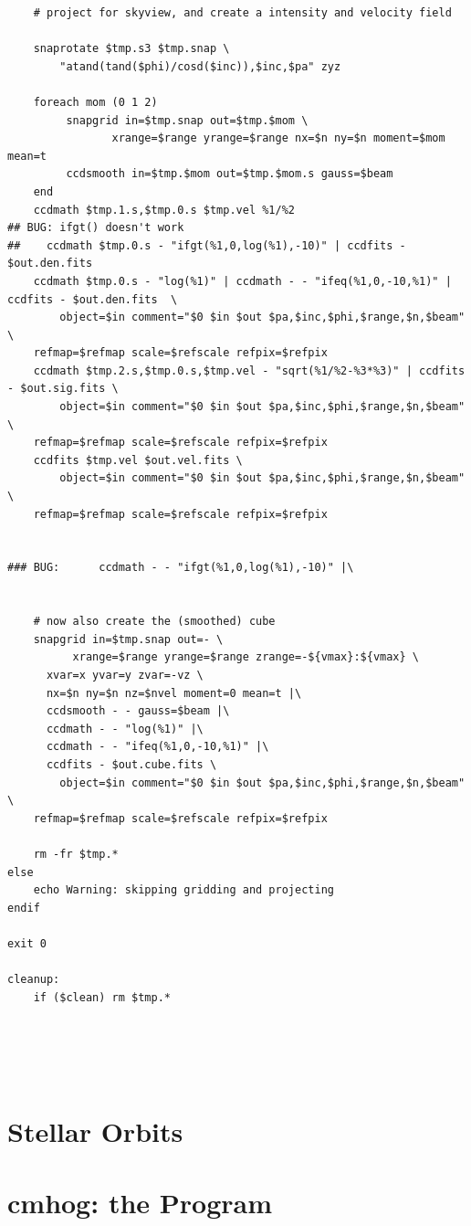 \documentclass[10pt,dvips]{article}
\begin{document}
\begin{verbatim}
    # project for skyview, and create a intensity and velocity field

    snaprotate $tmp.s3 $tmp.snap \
        "atand(tand($phi)/cosd($inc)),$inc,$pa" zyz

    foreach mom (0 1 2)
         snapgrid in=$tmp.snap out=$tmp.$mom \
                xrange=$range yrange=$range nx=$n ny=$n moment=$mom mean=t
         ccdsmooth in=$tmp.$mom out=$tmp.$mom.s gauss=$beam
    end
    ccdmath $tmp.1.s,$tmp.0.s $tmp.vel %1/%2
## BUG: ifgt() doesn't work
##    ccdmath $tmp.0.s - "ifgt(%1,0,log(%1),-10)" | ccdfits - $out.den.fits
    ccdmath $tmp.0.s - "log(%1)" | ccdmath - - "ifeq(%1,0,-10,%1)" | ccdfits - $out.den.fits  \
        object=$in comment="$0 $in $out $pa,$inc,$phi,$range,$n,$beam"  \
	refmap=$refmap scale=$refscale refpix=$refpix
    ccdmath $tmp.2.s,$tmp.0.s,$tmp.vel - "sqrt(%1/%2-%3*%3)" | ccdfits - $out.sig.fits \
        object=$in comment="$0 $in $out $pa,$inc,$phi,$range,$n,$beam" 	\
	refmap=$refmap scale=$refscale refpix=$refpix
    ccdfits $tmp.vel $out.vel.fits \
        object=$in comment="$0 $in $out $pa,$inc,$phi,$range,$n,$beam" 	\
	refmap=$refmap scale=$refscale refpix=$refpix


### BUG:      ccdmath - - "ifgt(%1,0,log(%1),-10)" |\


    # now also create the (smoothed) cube
    snapgrid in=$tmp.snap out=- \
          xrange=$range yrange=$range zrange=-${vmax}:${vmax} \
	  xvar=x yvar=y zvar=-vz \
	  nx=$n ny=$n nz=$nvel moment=0 mean=t |\
      ccdsmooth - - gauss=$beam |\
      ccdmath - - "log(%1)" |\
      ccdmath - - "ifeq(%1,0,-10,%1)" |\
      ccdfits - $out.cube.fits \
        object=$in comment="$0 $in $out $pa,$inc,$phi,$range,$n,$beam" \
	refmap=$refmap scale=$refscale refpix=$refpix

    rm -fr $tmp.*
else
    echo Warning: skipping gridding and projecting
endif

exit 0

cleanup:
    if ($clean) rm $tmp.*





\end{verbatim}\normalsize


\section{Stellar Orbits}



\section{cmhog: the Program}
\end{document}
